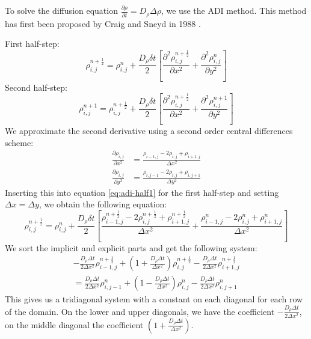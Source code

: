 \documentclass[a4paper]{article}
\begin{document}
To solve the diffusion equation $\frac{\partial \rho}{\partial t} = D_\rho \Delta \rho$, we use the ADI method.
This method has first been proposed by Craig and Sneyd in 1988 \cite{Craig_Sneyd_1988}.

First half-step:
\begin{equation}
	\rho_{i,j}^{n+\frac{1}{2}} = \rho_{i,j}^n + \frac{D_\rho \delta t}{2} \left[ \frac{\partial^2 \rho_{i,j}^{n+\frac{1}{2}}}{\partial x^2} + \frac{\partial^2 \rho_{i,j}^n}{\partial y^2} \right]
	\label{eq:adi-half1}
\end{equation}
Second half-step:
\begin{equation}
	\rho_{i,j}^{n+1} = \rho_{i,j}^{n+\frac{1}{2}} + \frac{D_\rho \delta t}{2} \left[ \frac{\partial^2 \rho_{i,j}^{n+\frac{1}{2}}}{\partial x^2} + \frac{\partial^2 \rho_{i,j}^{n+1}}{\partial y^2} \right]
	\label{eq:adi-half2}
\end{equation}
We approximate the second derivative using a second order central differences scheme:
\begin{align}
	\frac{\partial \rho_{i,j}}{\partial x^2} &= \frac{\rho_{i-1,j} - 2 \rho_{i,j} + \rho_{i+1,j}}{\Delta x^2} \\
	\frac{\partial \rho_{i,j}}{\partial y^2} &= \frac{\rho_{i,j-1} - 2 \rho_{i,j} + \rho_{i,j+1}}{\Delta y^2}
\end{align}
Inserting this into equation \ref{eq:adi-half1} for the first half-step and setting $\Delta x = \Delta y$, we obtain the following equation:
\begin{equation}
	\rho_{i,j}^{n+\frac{1}{2}} = \rho_{i,j}^n + \frac{D_\rho \delta t}{2} \left[ \frac{\rho_{i-1,j}^{n+\frac{1}{2}} - 2 \rho_{i,j}^{n+\frac{1}{2}} + \rho_{i+1,j}^{n+\frac{1}{2}}}{\Delta x^2} + \frac{\rho_{i-1,j}^n - 2 \rho_{i,j}^n + \rho_{i+1,j}^n}{\Delta x^2} \right]
\end{equation}
We sort the implicit and explicit parts and get the following system:
\begin{multline}
	-\frac{D_\rho \Delta t}{2 \Delta x^2} \rho_{i-1,j}^{n + \frac{1}{2}} + \left( 1 + \frac{D_\rho \Delta t}{\Delta x^2} \right) \rho_{i,j}^{n + \frac{1}{2}} - \frac{D_\rho \Delta t}{2 \Delta x^2} \rho_{i+1,j}^{n + \frac{1}{2}} \\
	= \frac{D_\rho \Delta t}{2 \Delta x^2} \rho_{i,j-1}^n + \left( 1 - \frac{D_\rho \Delta t}{\Delta x^2} \right) \rho_{i,j}^n - \frac{D_\rho \Delta t}{2 \Delta x^2} \rho_{i,j+1}^n
\end{multline}
This gives us a tridiagonal system with a constant on each diagonal for each row of the domain.
On the lower and upper diagonals, we have the coefficient $-\frac{D_\rho \Delta t}{2 \Delta x^2}$, on the middle diagonal the coefficient $\left( 1 + \frac{D_\rho \Delta t}{\Delta x^2} \right)$.
\end{document}
